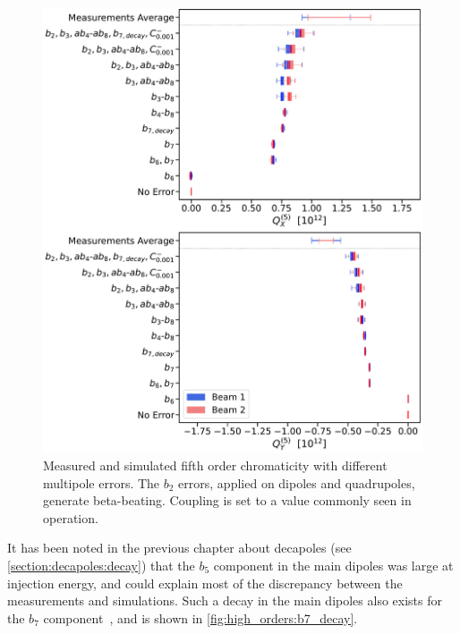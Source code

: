\begin{figure}[!htb]
    \centering
    \includegraphics[width=0.9\columnwidth]{images/q5_ptc.pdf}
    \caption{Measured and simulated fifth order chromaticity with different multipole errors. The
    $b_2$ errors, applied on dipoles and quadrupoles, generate beta-beating. Coupling is set to a
    value commonly seen in operation.}
    \label{fig:high_orders:beam1_q5_ptc}
\end{figure}


It has been noted in the previous chapter about decapoles (see \cref{section:decapoles:decay}) that
the $b_5$ component in the main dipoles was large at injection energy, and could explain most of the
discrepancy between the measurements and simulations.
Such a decay in the main dipoles also exists for the $b_7$ component~\cite{deniau2024private}, and
is shown in \cref{fig:high_orders:b7_decay}. 

